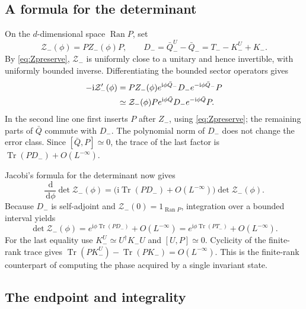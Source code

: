 \documentclass[11pt]{article}
\theoremstyle{definition}
\theoremstyle{remark}
\newcommand{\ii}{\mathrm i}
\newcommand{\dd}{\,\mathrm d}
\newcommand{\Tr}{\operatorname{Tr}}
\newcommand{\Ran}{\operatorname{Ran}}
\newcommand{\epsL}{O(L^{-\infty})}
\newcommand{\eqL}{\simeq}
\begin{document}
\subsection{A formula for the determinant}

On the \(d\)-dimensional space \(\Ran P\), set
\[
 \mathcal Z_-(\phi)=PZ_-(\phi)P,\qquad
 D_-=\bar Q_-^U-\bar Q_-=T_--K_-^U+K_-.
\]
By \eqref{eq:Zpreserve}, \(\mathcal Z_-\) is uniformly close to
a unitary and hence invertible, with uniformly bounded inverse.
Differentiating the bounded sector operators gives
\begin{align}
 -\ii\mathcal Z_-'(\phi)
 &=PZ_-(\phi)e^{\ii\phi\bar Q_-}
                D_-e^{-\ii\phi\bar Q_-}P \notag\\
 &\eqL\mathcal Z_-(\phi)
       P e^{\ii\phi\bar Q}D_-e^{-\ii\phi\bar Q}P.
       \label{eq:Zderivative}
\end{align}
In the second line one first inserts \(P\) after \(Z_-\), using
\eqref{eq:Zpreserve}; the remaining parts of \(\bar Q\) commute
with \(D_-\).  The polynomial norm of \(D_-\) does not change
the error class.  Since \([\bar Q,P]\eqL0\), the trace of the
last factor is \(\Tr(PD_-)+\epsL\).

Jacobi's formula for the determinant now gives
\[
 \frac{\dd}{\dd\phi}\det\mathcal Z_-(\phi)
   =\bigl(\ii\Tr(PD_-)+\epsL\bigr)
                      \det\mathcal Z_-(\phi).
\]
Because \(D_-\) is self-adjoint and \(\mathcal Z_-(0)=1_{\Ran P}\),
integration over a bounded interval yields
\begin{equation}\label{eq:detformula}
 \det\mathcal Z_-(\phi)
       =e^{\ii\phi\Tr(PD_-)}+\epsL
       =e^{\ii\phi\Tr(PT_-)}+\epsL.
\end{equation}
For the last equality use \(K_-^U\eqL U^\dagger K_-U\) and
\([U,P]\eqL0\).  Cyclicity of the finite-rank trace gives
\(\Tr(PK_-^U)-\Tr(PK_-)=\epsL\).
This is the finite-rank counterpart of computing the phase
acquired by a single invariant state.

\subsection{The endpoint and integrality}
\end{document}
